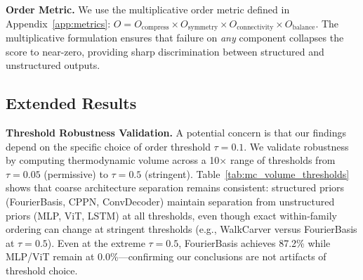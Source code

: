 \textbf{Order Metric.} We use the multiplicative order metric defined in Appendix~\ref{app:metrics}: $O = O_{\text{compress}} \times O_{\text{symmetry}} \times O_{\text{connectivity}} \times O_{\text{balance}}$. The multiplicative formulation ensures that failure on \emph{any} component collapses the score to near-zero, providing sharp discrimination between structured and unstructured outputs.

\subsection{Extended Results}

\textbf{Threshold Robustness Validation.} A potential concern is that our findings depend on the specific choice of order threshold $\tau=0.1$. We validate robustness by computing thermodynamic volume across a 10$\times$ range of thresholds from $\tau=0.05$ (permissive) to $\tau=0.5$ (stringent). Table~\ref{tab:mc_volume_thresholds} shows that coarse architecture separation remains consistent: structured priors (FourierBasis, CPPN, ConvDecoder) maintain separation from unstructured priors (MLP, ViT, LSTM) at all thresholds, even though exact within-family ordering can change at stringent thresholds (e.g., WalkCarver versus FourierBasis at $\tau=0.5$). Even at the extreme $\tau=0.5$, FourierBasis achieves 87.2\% while MLP/ViT remain at 0.0\%---confirming our conclusions are not artifacts of threshold choice.

